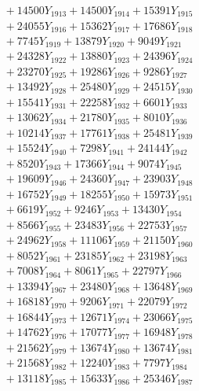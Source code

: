 \documentclass[a4paper,10pt]{article}
\begin{document}
{\begin{align}
&\;  + 14500 Y_{1913} + 14500 Y_{1914} + 15391 Y_{1915} \\[0.3ex]
&\;  + 24055 Y_{1916} + 15362 Y_{1917} + 17686 Y_{1918} \\[0.5ex]\allowbreak
&\;  + 7745 Y_{1919} + 13879 Y_{1920} + 9049 Y_{1921} \\[0.3ex]
&\;  + 24328 Y_{1922} + 13880 Y_{1923} + 24396 Y_{1924} \\[0.3ex]
&\;  + 23270 Y_{1925} + 19286 Y_{1926} + 9286 Y_{1927} \\[0.3ex]
&\;  + 13492 Y_{1928} + 25480 Y_{1929} + 24515 Y_{1930} \\[0.3ex]
&\;  + 15541 Y_{1931} + 22258 Y_{1932} + 6601 Y_{1933} \\[0.3ex]
&\;  + 13062 Y_{1934} + 21780 Y_{1935} + 8010 Y_{1936} \\[0.3ex]
&\;  + 10214 Y_{1937} + 17761 Y_{1938} + 25481 Y_{1939} \\[0.3ex]
&\;  + 15524 Y_{1940} + 7298 Y_{1941} + 24144 Y_{1942} \\[0.3ex]
&\;  + 8520 Y_{1943} + 17366 Y_{1944} + 9074 Y_{1945} \\[0.3ex]
&\;  + 19609 Y_{1946} + 24360 Y_{1947} + 23903 Y_{1948} \\[0.5ex]\allowbreak
&\;  + 16752 Y_{1949} + 18255 Y_{1950} + 15973 Y_{1951} \\[0.3ex]
&\;  + 6619 Y_{1952} + 9246 Y_{1953} + 13430 Y_{1954} \\[0.3ex]
&\;  + 8566 Y_{1955} + 23483 Y_{1956} + 22753 Y_{1957} \\[0.3ex]
&\;  + 24962 Y_{1958} + 11106 Y_{1959} + 21150 Y_{1960} \\[0.3ex]
&\;  + 8052 Y_{1961} + 23185 Y_{1962} + 23198 Y_{1963} \\[0.3ex]
&\;  + 7008 Y_{1964} + 8061 Y_{1965} + 22797 Y_{1966} \\[0.3ex]
&\;  + 13394 Y_{1967} + 23480 Y_{1968} + 13648 Y_{1969} \\[0.3ex]
&\;  + 16818 Y_{1970} + 9206 Y_{1971} + 22079 Y_{1972} \\[0.3ex]
&\;  + 16844 Y_{1973} + 12671 Y_{1974} + 23066 Y_{1975} \\[0.3ex]
&\;  + 14762 Y_{1976} + 17077 Y_{1977} + 16948 Y_{1978} \\[0.5ex]\allowbreak
&\;  + 21562 Y_{1979} + 13674 Y_{1980} + 13674 Y_{1981} \\[0.3ex]
&\;  + 21568 Y_{1982} + 12240 Y_{1983} + 7797 Y_{1984} \\[0.3ex]
&\;  + 13118 Y_{1985} + 15633 Y_{1986} + 25346 Y_{1987} \\[0.3ex]

\end{align}}
\end{document}
